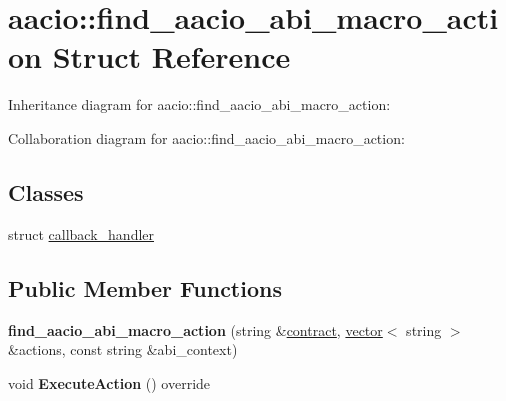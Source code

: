 \hypertarget{structaacio_1_1find__aacio__abi__macro__action}{}\section{aacio\+:\+:find\+\_\+aacio\+\_\+abi\+\_\+macro\+\_\+action Struct Reference}
\label{structaacio_1_1find__aacio__abi__macro__action}


Inheritance diagram for aacio\+:\+:find\+\_\+aacio\+\_\+abi\+\_\+macro\+\_\+action\+:


Collaboration diagram for aacio\+:\+:find\+\_\+aacio\+\_\+abi\+\_\+macro\+\_\+action\+:
\subsection*{Classes}
\begin{DoxyCompactItemize}
\item 
struct \mbox{\hyperlink{structaacio_1_1find__aacio__abi__macro__action_1_1callback__handler}{callback\+\_\+handler}}
\end{DoxyCompactItemize}
\subsection*{Public Member Functions}
\begin{DoxyCompactItemize}
\item 
\mbox{\label{structaacio_1_1find__aacio__abi__macro__action_a4c2a8d57f13b371859caf1bd68d81a60}} 
{\bfseries find\+\_\+aacio\+\_\+abi\+\_\+macro\+\_\+action} (string \&\mbox{\hyperlink{structaacio_1_1contract}{contract}}, \mbox{\hyperlink{classstd_1_1vector}{vector}}$<$ string $>$ \&actions, const string \&abi\+\_\+context)
\item 
\mbox{\label{structaacio_1_1find__aacio__abi__macro__action_aafc1e4e31e08efecabc61fece92d623b}} 
void {\bfseries Execute\+Action} () override
\end{DoxyCompactItemize}
